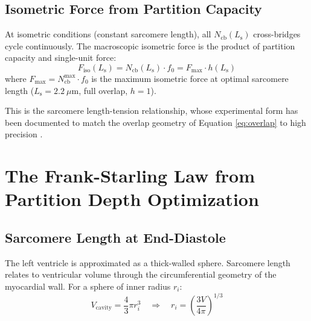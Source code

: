 \documentclass[12pt,a4paper]{article}
\theoremstyle{remark}
\newcommand{\Ncb}{N_{\mathrm{cb}}}
\newcommand{\Ls}{L_{\mathrm{s}}}
\begin{document}
\subsection{Isometric Force from Partition Capacity}

At isometric conditions (constant sarcomere length), all $\Ncb(\Ls)$ cross-bridges cycle continuously. The macroscopic isometric force is the product of partition capacity and single-unit force:
\begin{equation}
    F_{\mathrm{iso}}(\Ls) = \Ncb(\Ls) \cdot f_0 = F_{\max} \cdot h(\Ls)
    \label{eq:force_iso}
\end{equation}
where $F_{\max} = \Ncb^{\max} \cdot f_0$ is the maximum isometric force at optimal sarcomere length ($\Ls = 2.2~\mu\mathrm{m}$, full overlap, $h = 1$).

This is the sarcomere length-tension relationship, whose experimental form has been documented to match the overlap geometry of Equation \ref{eq:overlap} to high precision \cite{gordon1966tension}.

\section{The Frank-Starling Law from Partition Depth Optimization}
\label{sec:frank-starling}

\subsection{Sarcomere Length at End-Diastole}

The left ventricle is approximated as a thick-walled sphere. Sarcomere length relates to ventricular volume through the circumferential geometry of the myocardial wall. For a sphere of inner radius $r_i$:
\begin{equation}
    V_{\mathrm{cavity}} = \frac{4}{3}\pi r_i^3 \quad\Rightarrow\quad r_i = \left(\frac{3V}{4\pi}\right)^{1/3}
\end{equation}
\end{document}
